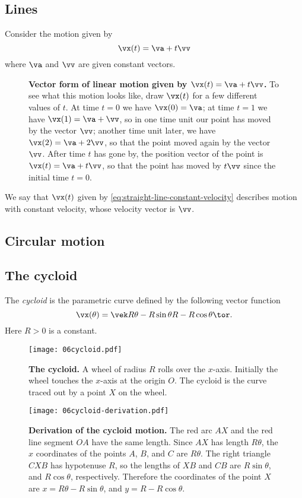 \subsection{Lines}
Consider the motion given by
\begin{equation}
  \vx(t) = \va + t\vv
  \label{eq:straight-line-constant-velocity}
\end{equation}
where $\va $ and $\vv$ are given constant vectors.
\begin{figure}[h]
  \centering
  
  \caption{\textbf{Vector form of linear motion given by $\vx(t) = \va+t\vv$. } To
  see what this motion looks like, draw $\vx(t)$ for a few different values
  of $t$.  At time $t=0$ we have $\vx(0) = \va$; at time $t=1$ we have $\vx(1) =
  \va+\vv$, so in one time unit our point has moved by the vector $\vv$; another time
  unit later, we have $\vx(2) = \va+2\vv$, so that the point moved again by the
  vector $\vv$. After time $t$ has gone by, the position vector of the point is
  $\vx(t) = \va+t\vv$, so that the point has moved by $t\vv$ since the initial time
  $t=0$.  }
  \label{fig:vector-form-linear-motion}
\end{figure}
We say that $\vx(t)$ given by
\eqref{eq:straight-line-constant-velocity} describes motion with
constant velocity, whose velocity vector is $\vv$.


\subsection{Circular motion}

\subsection{The cycloid}
The \emph{cycloid} is the parametric curve defined by the following vector function
\begin{equation}
  \vx(\theta) = \vek R\theta - R\sin\theta \\ R-R\cos\theta\tor.
  \label{eq:cycloid}
\end{equation}
Here $R>0$ is a constant.
\begin{figure}[h]
  \texttt{[image: 06cycloid.pdf]}
  \caption{\textbf{The cycloid. }  A wheel of radius $R$ rolls over the $x$-axis.
  Initially the wheel touches the $x$-axis at the origin $O$.  The cycloid is the
  curve traced out by a point $X$ on the wheel.}
\end{figure}
\begin{figure}[h]
  \texttt{[image: 06cycloid-derivation.pdf]}
  \caption{\textbf{Derivation of the cycloid motion. }  The red arc $AX$ and the red
  line segment $OA$ have the same length.  Since $AX$ has length $R\theta$, the $x$
  coordinates of the points $A$, $B$, and $C$ are $R\theta$. The right triangle $CXB$
  has hypotenuse $R$, so the lengths of $XB$ and $CB$ are $R\sin\theta$, and
  $R\cos\theta$, respectively.  Therefore the coordinates of the point $X$ are
  $x=R\theta - R\sin\theta$, and $y=R-R\cos \theta$.}
\end{figure}

